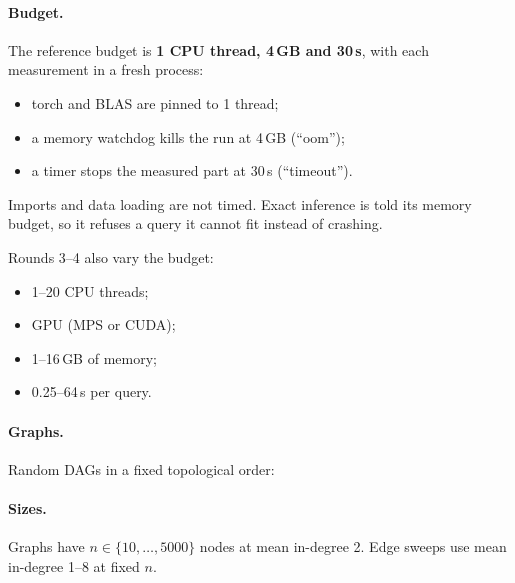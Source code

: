 \documentclass[10pt,a4paper]{article}
\begin{document}
\paragraph{Budget.} The reference budget is \textbf{1 CPU thread, 4\,GB and 30\,s}, with each measurement in a fresh process:
\begin{itemize}
\item torch and BLAS are pinned to 1 thread;
\item a memory watchdog kills the run at 4\,GB (``oom'');
\item a timer stops the measured part at 30\,s (``timeout'').
\end{itemize}
Imports and data loading are not timed. Exact inference is told its memory budget, so it refuses a query it cannot fit instead of crashing.

Rounds 3--4 also vary the budget:
\begin{itemize}
\item 1--20 CPU threads;
\item GPU (MPS or CUDA);
\item 1--16\,GB of memory;
\item 0.25--64\,s per query.
\end{itemize}

\paragraph{Graphs.} Random DAGs in a fixed topological order:
\begin{center}\small{}\end{center}

\paragraph{Sizes.} Graphs have $n\in\{10,\dots,5000\}$ nodes at mean in-degree 2. Edge sweeps use mean in-degree 1--8 at fixed $n$.
\end{document}
